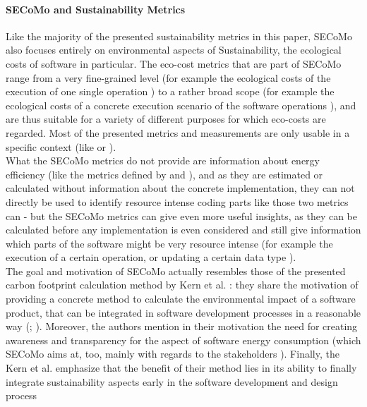\paragraph{SECoMo and Sustainability Metrics}
Like the majority of the presented sustainability metrics %
in this paper, SECoMo also focuses entirely on environmental aspects of Sustainability, the ecological costs of software in particular. The eco-cost metrics that are part of SECoMo range from a very fine-grained level (for example the ecological costs of the execution of one single operation \cite{schulze_cost_2016}) to a rather broad scope (for example the ecological costs of a concrete execution scenario of the software operations \cite{schulze_cost_2016}), and are thus suitable for a variety of different purposes for which eco-costs are regarded. Most of the presented metrics and measurements are only usable in a specific context (like \cite{naumann_how_2008} or \cite{capra_is_2012}).\\ %
What the SECoMo metrics do not provide are information about energy efficiency (like the metrics defined by \cite{capra_is_2012} and \cite{johann_how_2012}), and as they are estimated or calculated without information about the concrete implementation, they can not directly be used to identify resource intense coding parts like those two metrics can - but the SECoMo metrics can give even more useful insights, as they can be calculated before any implementation is even considered and still give information which parts of the software might be very resource intense (for example the execution of a certain operation, or updating a certain data type \cite{schulze_cost_2016}).\\
The goal and motivation of SECoMo actually resembles those of the presented carbon footprint calculation method by Kern et al. \cite{kern_impacts_2015}: they share the motivation of providing a concrete method to calculate the environmental impact of a software product, that can be integrated in software development processes in a reasonable way %
(\cite{kern_impacts_2015}; \cite{schulze_cost_2016}). Moreover, the authors mention in their motivation the need for creating awareness and transparency for the aspect of software energy consumption \cite{kern_impacts_2015} (which SECoMo aims at, too, mainly with regards to the stakeholders \cite{schulze_cost_2016}). Finally, the Kern et al. emphasize that the benefit of their method lies in its ability to finally integrate sustainability aspects early in the software development and design process %
